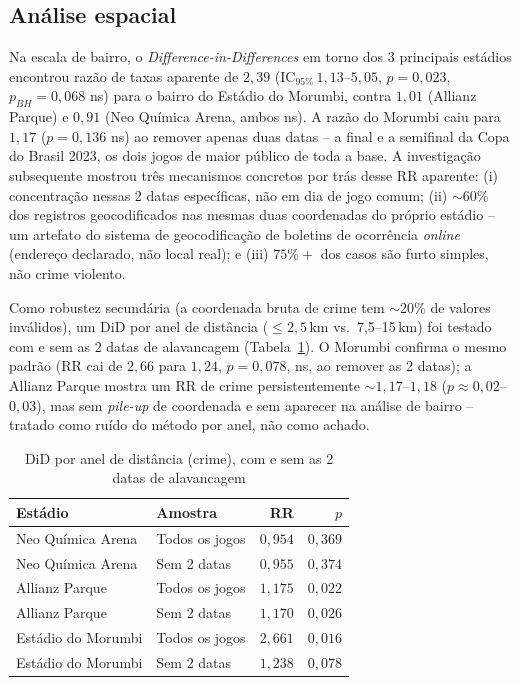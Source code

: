 \documentclass[12pt]{article}
\begin{document}
\subsection{Análise espacial}

Na escala de bairro, o \emph{Difference-in-Differences} em torno dos 3
principais estádios encontrou razão de taxas aparente de $2,39$
($\text{IC}_{95\%}\,1,13$--$5,05$, $p=0,023$, $p_{BH}=0,068$ ns) para o
bairro do Estádio do Morumbi, contra $1,01$ (Allianz Parque) e $0,91$
(Neo Química Arena, ambos ns). A razão do Morumbi caiu para $1,17$
($p=0,136$ ns) ao remover apenas duas datas -- a final e a semifinal da
Copa do Brasil 2023, os dois jogos de maior público de toda a base. A
investigação subsequente mostrou três mecanismos concretos por trás desse
RR aparente: (i) concentração nessas 2 datas específicas, não em dia de
jogo comum; (ii) $\sim$60\% dos registros geocodificados nas mesmas duas
coordenadas do próprio estádio -- um artefato do sistema de
geocodificação de boletins de ocorrência \emph{online} (endereço
declarado, não local real); e (iii) $75\%+$ dos casos são furto simples,
não crime violento.

Como robustez secundária (a coordenada bruta de crime tem $\sim$20\% de
valores inválidos), um DiD por anel de distância ($\leq2,5$\,km vs.\
7,5--15\,km) foi testado com e sem as 2 datas de alavancagem
(Tabela~\ref{tab:did-anel}). O Morumbi confirma o mesmo padrão (RR cai de
$2,66$ para $1,24$, $p=0,078$, ns, ao remover as 2 datas); a Allianz
Parque mostra um RR de crime persistentemente $\sim$$1,17$--$1,18$
($p\approx0,02$--$0,03$), mas sem \emph{pile-up} de coordenada e sem
aparecer na análise de bairro -- tratado como ruído do método por anel,
não como achado.

\begin{table}[ht]
\centering
\caption{DiD por anel de distância (crime), com e sem as 2 datas de
alavancagem}
\label{tab:did-anel}
\small
\begin{tabular}{@{}llrr@{}}
\toprule
\textbf{Estádio} & \textbf{Amostra} & \textbf{RR} & \textbf{$p$} \\
\midrule
Neo Química Arena  & Todos os jogos   & $0,954$ & $0,369$ \\
Neo Química Arena  & Sem 2 datas      & $0,955$ & $0,374$ \\
Allianz Parque     & Todos os jogos   & $1,175$ & $0,022$ \\
Allianz Parque     & Sem 2 datas      & $1,170$ & $0,026$ \\
Estádio do Morumbi & Todos os jogos   & $2,661$ & $0,016$ \\
Estádio do Morumbi & Sem 2 datas      & $1,238$ & $0,078$ \\
\bottomrule
\end{tabular}
\end{table}
\end{document}
